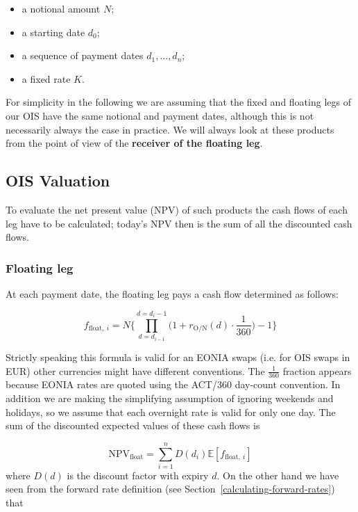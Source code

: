 \begin{itemize}
\tightlist
\item
  a notional amount \(N\);
\item
  a starting date \(d_0\);
\item
  a sequence of payment dates \(d_1,...,d_n\);
\item
  a fixed rate \(K\).
\end{itemize}

For simplicity in the following we are assuming that the fixed and
floating legs of our OIS have the same notional and payment dates,
although this is not necessarily always the case in practice.
We will always look at these products from the point of view of the
\textbf{receiver of the floating leg}.

\subsection{OIS Valuation}\label{ois-valuation}
To evaluate the net present value (NPV) of such products the cash flows
of each leg have to be calculated; today's NPV then is the sum of all
the discounted cash flows.

\subsubsection{Floating leg}\label{floating-leg}

At each payment date, the floating leg pays a cash flow determined as
follows:

\begin{equation}
f_{\mathrm{float},~i} = N \Bigg\{\prod_{d=d_{i-1}}^{d=d_i-1}\Big(1+r_{\mathrm{O/N}}(d)\cdot\frac{1}{360}\Big) -1 \Bigg\}
\label{eq:floating_ois}
\end{equation}

Strictly speaking this formula is valid for an EONIA swaps
(i.e. for OIS swaps in EUR) other currencies might have
different conventions. The \(\frac{1}{360}\) fraction appears because
EONIA rates are quoted using the ACT/360 day-count convention. In
addition we are making the simplifying assumption of ignoring weekends
and holidays, so we assume that each overnight rate is valid for only
one day. The sum of the discounted expected values of these cash flows
is

\begin{equation}
\mathrm{NPV}_{\mathrm{float}} = \sum_{i=1}^{n}D(d_i)\mathbb{E}[f_{\mathrm{float},~i}]
\end{equation}
where \(D(d)\) is the discount factor with expiry \(d\). On the other
hand we have seen from the forward rate definition (see Section~\ref{calculating-forward-rates}) that

